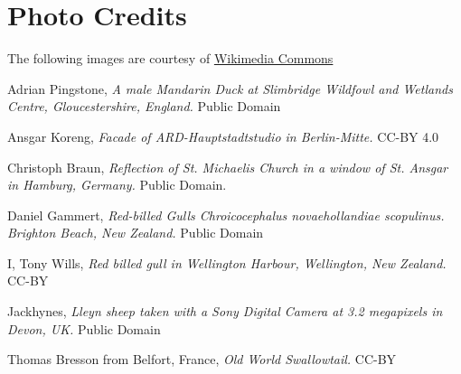 \documentclass{ximera}
\begin{document}
\begin{problem}
 \begin{image}[2in]  
\end{image}
 \end{problem}


\section*{Photo Credits}
The following images are courtesy of \href{https://commons.wikimedia.org/wiki/Main_Page}
{Wikimedia Commons}

Adrian Pingstone, {\it A male Mandarin Duck at Slimbridge Wildfowl and Wetlands Centre, Gloucestershire, England.} Public Domain

Ansgar Koreng, {\it Facade of ARD-Hauptstadtstudio in Berlin-Mitte.} CC-BY 4.0

Christoph Braun, {\it Reflection of St. Michaelis Church in a window of St. Ansgar in Hamburg, Germany.} Public Domain.

Daniel Gammert, {\it Red-billed Gulls Chroicocephalus novaehollandiae scopulinus. Brighton Beach, New Zealand.} Public Domain

 I, Tony Wills, {\it Red billed gull in Wellington Harbour, Wellington, New Zealand.}  CC-BY

Jackhynes, {\it Lleyn sheep taken with a Sony Digital Camera at 3.2 megapixels in Devon, UK.} Public Domain

Thomas Bresson from Belfort, France, {\it Old World Swallowtail.} CC-BY
\end{document}

